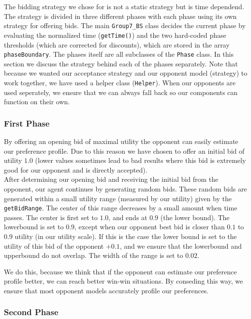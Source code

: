 The bidding strategy we chose for is not a static strategy but is time dependend. The strategy is divided in three different phases with each phase using its own strategy for offering bids. The main \texttt{Group7\_BS} class decides the current phase by evaluating the normalized time (\texttt{getTime()}) and the two hard-coded phase thresholds (which are corrected for discounts), which are stored in the array \texttt{phaseBoundary}. 
The phases itself are all subclasses of the \verb-Phase- class. 
In this section we discuss the strategy behind each of the phases separately. 
Note that because we wanted our acceptance strategy and our opponent model (strategy) to 
work together, we have used a helper class (\verb-Helper-). When our opponents are used
seperately, we ensure that we can always fall back so our components can function on their own.

\subsubsection{First Phase}
By offering an opening bid of maximal utility the opponent can easily estimate our preference profile. Due to this reason we have chosen to offer an initial bid of utility $1.0$ (lower values sometimes lead to bad results where this bid is extremely good for our opponent and is directly accepted).\\ 

After determining our opening bid and receiving the initial bid from the opponent, our agent continues by generating random bids. These random bids are generated within a small utility range (measured by our utility) given by the \verb-getBidRange-. The center of this range decreases by a small amount when time passes.
The center is first set to $1.0$, and ends at $0.9$ (the lower bound). The lowerbound is set to $0.9$, except when our opponent best bid is closer than $0.1$ to $0.9$ utility (in our utility scale). If this is the case the lower bound is set to the utility of this bid of the opponent $+0.1$, and we ensure that the lowerbound and upperbound do not overlap. The width of the range is set to  $0.02$. 

We do this, because we think that if the opponent can estimate our preference profile better,
we can reach better win-win situations. By conseding this way, we ensure that most opponent 
models accurately profile our preferences.

\subsubsection{Second Phase}

